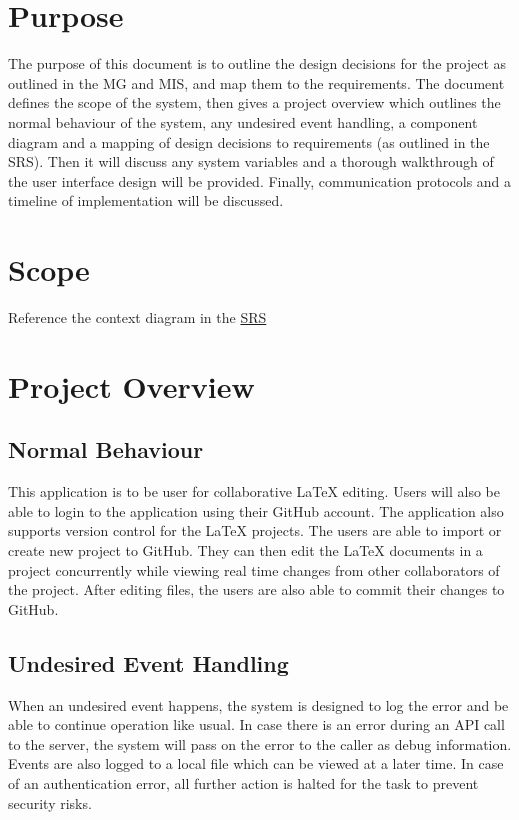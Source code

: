 \documentclass[12pt, titlepage]{article}
\begin{document}
	\section{Purpose}
	The purpose of this document is to outline the design decisions for the project as outlined in the MG and MIS, and map them to the requirements. The document defines the scope of the system, then gives a project overview which outlines the normal behaviour of the system, any undesired event handling, a component diagram and a mapping of design decisions to requirements (as outlined in the SRS). Then it will discuss any system variables and a thorough walkthrough of the user interface design will be provided. Finally, communication protocols and a timeline of implementation will be discussed.
	
	\section{Scope}
	
	Reference the context diagram in the \href{https://github.com/RutheniumVI/UnderTree/blob/main/docs/SRS/SRS.pdf}{SRS}
	
	\section{Project Overview}
	
	\subsection{Normal Behaviour}
	
	This application is to be user for collaborative LaTeX editing. Users will also be able to login to the application using their GitHub account. The application also supports version control for the LaTeX projects. The users are able to import or create new project to GitHub. They can then edit the LaTeX documents in a project concurrently while viewing real time changes from other collaborators of the project. After editing files, the users are also able to commit their changes to GitHub. 
	
	\subsection{Undesired Event Handling}
	
	When an undesired event happens, the system is designed to log the error and be able to continue operation like usual. In case there is an error during an API call to the server, the system will pass on the error to the caller as debug information. Events are also logged to a local file which can be viewed at a later time. In case of an authentication error, all further action is halted for the task to prevent security risks.
	
\end{document}
